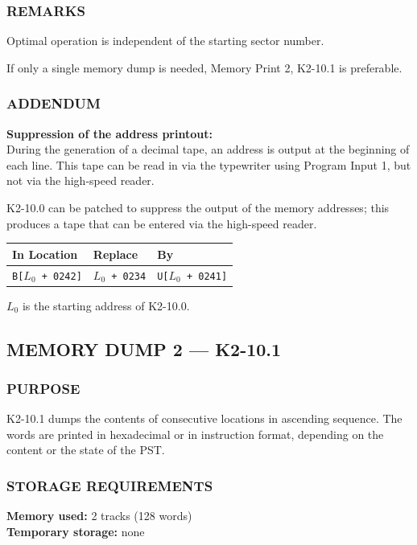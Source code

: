 \subsubsection*{REMARKS}
Optimal operation is independent of the starting sector number.

If only a single memory dump is needed, Memory Print 2, K2-10.1 is preferable.

\subsubsection*{ADDENDUM}
\textbf{Suppression of the address printout:} \\
During the generation of a decimal tape, an address is output at the beginning of each line. This tape can be read in via the typewriter using Program Input 1, but not via the high-speed reader.

K2-10.0 can be patched to suppress the output of the memory addresses; this produces a tape that can be entered via the high-speed reader.

\begin{table}[h!]
\centering
\begin{tabular}{lll}
\toprule
\textbf{In Location} & \textbf{Replace} & \textbf{By} \\
\midrule
\texttt{B[$L_0$ + 0242]} & \texttt{$L_0$ + 0234} & \texttt{U[$L_0$ + 0241]} \\
\bottomrule
\end{tabular}
\end{table}
$L_0$ is the starting address of K2-10.0.
\newpage
\subsection*{MEMORY DUMP 2 --- K2-10.1}

\subsubsection*{PURPOSE}
K2-10.1 dumps the contents of consecutive locations in ascending sequence. The words are printed in hexadecimal or in instruction format, depending on the content or the state of the \textsf{PST}. 

\subsubsection*{STORAGE REQUIREMENTS}
\textbf{Memory used:} 2 tracks (128 words) \\
\textbf{Temporary storage:} none

